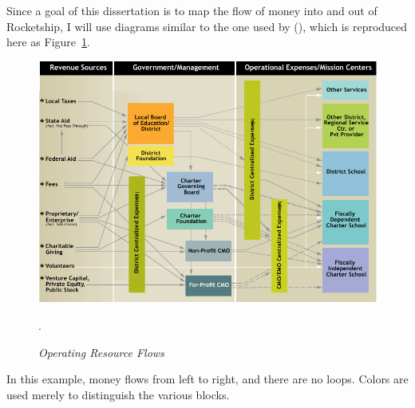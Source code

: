 Since a goal of this dissertation is to map the flow of money into and out of Rocketship, I will use diagrams similar to the one used by \citeauthor{Baker.Miron2015} (\citeyear{Baker.Miron2015}), which is reproduced here as Figure~\ref{fig:opresflows}.
\begin{figure}[ht]
  \centering
  \caption[Operating Resource Flows]{\textit{Operating Resource Flows}}\label{fig:opresflows}
  \includegraphics[width=\textwidth]{Operating_Resource_Flows}\\
  \footnotesize\raggedright\textcite[16]{Baker.Miron2015}.
\end{figure}
In this example, money flows from left to right, and there are no loops. Colors are used merely to distinguish the various blocks.

